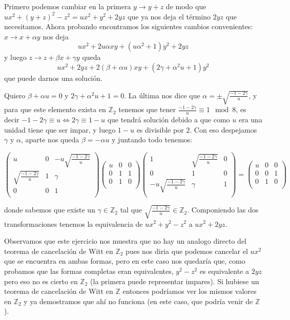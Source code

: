 \documentclass[12pt]{amsart}
\newcommand{\ZZ}{\mathbb{Z}}
\newcommand{\lp}{\left(}
\newcommand{\rp}{\right)}
\theoremstyle{plain}
\begin{document}
Primero podemos cambiar en la primera $y\to y+z$ de modo que 
$ux^2+(y+z)^2-z^2=ux^2+y^2+2yz$ que ya nos deja el término $2yz$ que 
necesitamos. Ahora probando encontramos los siguientes cambios 
convenientes: $x\to x+\alpha y$ nos deja 
$$ux^2+2u\alpha xy + (u\alpha^2+1)y^2+2yz$$
y luego $z\to z+\beta x+\gamma y$ queda
$$ux^2+2yz+2(\beta+\alpha u)xy+(2\gamma+\alpha^2u+1)y^2$$ 
que puede darnos una solución.

Quiero $\beta+\alpha u=0$ y $2\gamma+\alpha^2u+1=0$. La última nos 
dice que $\alpha=\pm\sqrt{\frac{-1-2\gamma}{u}}$, y para que este 
elemento exista en $\ZZ_2$ tenemos que tener $\frac{-1-2\gamma}{u}
\equiv 1\mod 8$, es decir $-1-2\gamma\equiv u \iff 2\gamma\equiv 
1-u$ que tendrá solución debido a que como $u$ era una unidad 
tiene que ser impar, y luego $1-u$ es divisible por $2$. Con eso 
despejamos $\gamma$ y $\alpha$, aparte nos queda $\beta=-\alpha u$
y juntando todo tenemos:

$$\lp\begin{matrix}
    u&0&-u\sqrt{\frac{-1-2\gamma}{u}} \\
    \sqrt{\frac{-1-2\gamma}{u}}&1&\gamma \\
    0&0&1 \\
\end{matrix}\rp
\lp\begin{matrix}
    u&0&0 \\
    0&1&1 \\
    0&1&0 \\
\end{matrix}\rp
\lp\begin{matrix}
    1&\sqrt{\frac{-1-2\gamma}{u}}&0 \\
    0&1&0 \\
    -u\sqrt{\frac{-1-2\gamma}{u}}&\gamma&1 \\
\end{matrix}\rp=
\lp\begin{matrix}
    u&0&0 \\
    0&0&1 \\
    0&1&0 \\
\end{matrix}\rp$$

donde sabemos que existe un $\gamma \in \ZZ_2$ tal que 
$\sqrt{\frac{-1-2\gamma}{u}}\in\ZZ_2$. Componiendo las dos 
transformaciones tenemos la equivalencia de $ux^2+y^2-z^2$ a
$ux^2+2yz$.

Observamos que este ejercicio nos muestra que no hay un analogo 
directo del teorema de cancelación de Witt en $\ZZ_2$ pues nos 
diria que podemos cancelar el $ux^2$ que se encuentra en ambas 
formas, pero en este caso nos quedaría que, como probamos que las formas
completas eran equivalentes, $y^2-z^2$ es equivalente a $2yz$ pero
eso no es cierto en $\ZZ_2$ (la primera puede representar impares).
Si hubiese un teorema de cancelación de Witt en $\ZZ$ entonces 
podríamos ver los mismos valores en $\ZZ_2$ y ya demostramos que 
ahí no funciona (en este caso, que podría venir de $\ZZ$).
\end{document}
